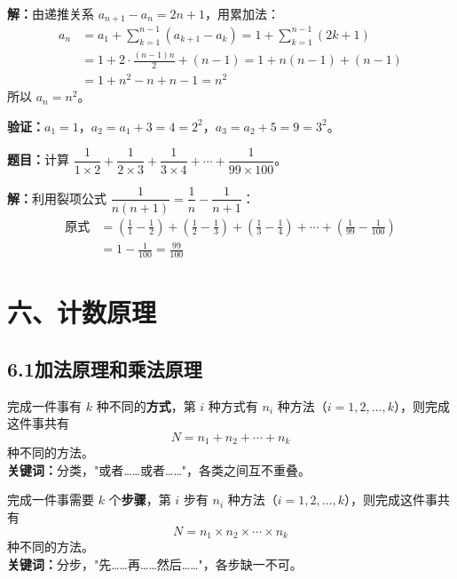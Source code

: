 \documentclass[12pt, a4paper]{ctexart}
\begin{document}
\textbf{解：}\;由递推关系 $a_{n+1}-a_n=2n+1$，用累加法：
\begin{align*}
a_n &= a_1+\sum_{k=1}^{n-1}(a_{k+1}-a_k) = 1+\sum_{k=1}^{n-1}(2k+1) \\
    &= 1+2\cdot\frac{(n-1)n}{2}+(n-1) = 1+n(n-1)+(n-1) \\
    &= 1+n^2-n+n-1 = n^2
\end{align*}
所以 $a_n=\boxed{n^2}$。

\textbf{验证：}$a_1=1$，$a_2=a_1+3=4=2^2$，$a_3=a_2+5=9=3^2$。\checkmark

\begin{examplebox}[【例14】裂项求和]
\textbf{题目：}计算 $\dfrac{1}{1\times 2}+\dfrac{1}{2\times 3}+\dfrac{1}{3\times 4}+\cdots+\dfrac{1}{99\times 100}$。
\end{examplebox}

\textbf{解：}\;利用裂项公式 $\dfrac{1}{n(n+1)}=\dfrac{1}{n}-\dfrac{1}{n+1}$：
\begin{align*}
\text{原式} &= \left(\frac{1}{1}-\frac{1}{2}\right)+\left(\frac{1}{2}-\frac{1}{3}\right)+\left(\frac{1}{3}-\frac{1}{4}\right)+\cdots+\left(\frac{1}{99}-\frac{1}{100}\right) \\
           &= 1-\frac{1}{100} = \boxed{\frac{99}{100}}
\end{align*}

\newpage
\section*{\textcolor{mainblue}{六、计数原理}}

\subsection*{6.1\quad 加法原理和乘法原理}

\begin{knowledgebox}[加法原理]
完成一件事有 $k$ 种不同的\textbf{方式}，第 $i$ 种方式有 $n_i$ 种方法（$i=1,2,\ldots,k$），则完成这件事共有
\[N=n_1+n_2+\cdots+n_k\]
种不同的方法。\\[4pt]
\textbf{关键词：}分类，"或者……或者……"，各类之间互不重叠。
\end{knowledgebox}

\begin{knowledgebox}[乘法原理]
完成一件事需要 $k$ 个\textbf{步骤}，第 $i$ 步有 $n_i$ 种方法（$i=1,2,\ldots,k$），则完成这件事共有
\[N=n_1\times n_2\times\cdots\times n_k\]
种不同的方法。\\[4pt]
\textbf{关键词：}分步，"先……再……然后……"，各步缺一不可。
\end{knowledgebox}
\end{document}
